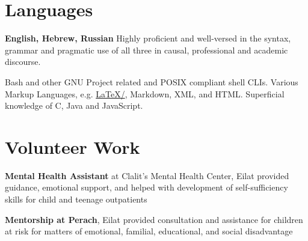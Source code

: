 \section{Languages}

{\textbf{English, Hebrew, Russian}}
{Highly proficient and well-versed in the syntax, grammar and pragmatic use of all three in causal, professional and academic discourse.}
{}

{Bash and other GNU Project related and POSIX compliant shell CLIs. Various Markup Languages, e.g. \href{https://github.com/kiril-u/cv/}{\LaTeX/\XeTeX}, Markdown, XML, and HTML. Superficial knowledge of C, Java and JavaScript.}
{}

\section{Volunteer Work}

{\textbf{Mental Health Assistant} at Clalit's Mental Health Center, Eilat}
{provided guidance, emotional support, and helped with development of self-sufficiency skills for child and teenage outpatients}
{}

{\textbf{Mentorship at Perach}, Eilat}
{provided consultation and assistance for children at risk for matters of emotional, familial, educational, and social disadvantage}
{} 
\unsetLTR
